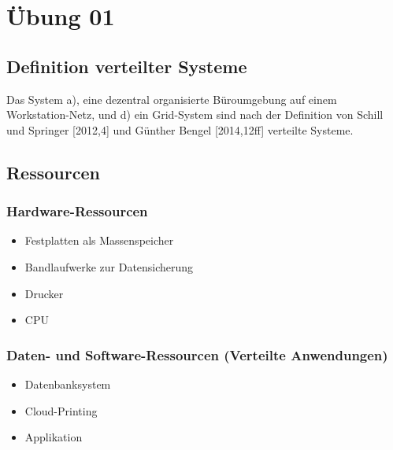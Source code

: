 \documentclass[a4paper]{scrartcl}
\begin{document}
\newpage

%
%

\thispagestyle{empty}

\tableofcontents

\newpage

%
%

\setcounter{page}{3}
\section{Übung 01}



\subsection{Definition verteilter Systeme}
Das System a), eine dezentral organisierte Büroumgebung auf einem Workstation-Netz, und d) ein Grid-System sind nach der Definition von Schill und Springer [2012,4] und Günther Bengel [2014,12ff] verteilte Systeme. 

\subsection{Ressourcen}
	\subsubsection{Hardware-Ressourcen}
		\begin{itemize}
			\item Festplatten als Massenspeicher
			\item Bandlaufwerke zur Datensicherung
			\item Drucker
			\item CPU
		\end{itemize}
	\subsubsection{Daten- und Software-Ressourcen (Verteilte Anwendungen)}
		\begin{itemize}
			\item Datenbanksystem
			\item Cloud-Printing
			\item Applikation
		\end{itemize}
\end{document}
